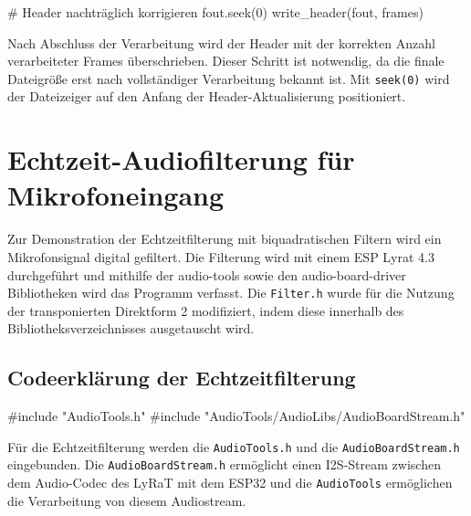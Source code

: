 \documentclass[
  ngerman,
  letterpaper,
  DIV=11]{scrreprt}
\newenvironment{Shaded}{\begin{snugshade}}{\end{snugshade}}
\newcommand{\CommentTok}[1]{\textcolor[rgb]{0.37,0.37,0.37}{#1}}
\newcommand{\DecValTok}[1]{\textcolor[rgb]{0.68,0.00,0.00}{#1}}
\newcommand{\ImportTok}[1]{\textcolor[rgb]{0.00,0.46,0.62}{#1}}
\newcommand{\NormalTok}[1]{\textcolor[rgb]{0.00,0.23,0.31}{#1}}
\newcommand{\PreprocessorTok}[1]{\textcolor[rgb]{0.68,0.00,0.00}{#1}}
\begin{document}
\begin{Shaded}
\begin{Highlighting}[]
    \CommentTok{\# Header nachträglich korrigieren}
\NormalTok{    fout.seek(}\DecValTok{0}\NormalTok{)}
\NormalTok{    write\_header(fout, frames)}
\end{Highlighting}
\end{Shaded}

Nach Abschluss der Verarbeitung wird der Header mit der korrekten Anzahl
verarbeiteter Frames überschrieben. Dieser Schritt ist notwendig, da die
finale Dateigröße erst nach vollständiger Verarbeitung bekannt ist. Mit
\texttt{seek(0)} wird der Dateizeiger auf den Anfang der
Header-Aktualisierung positioniert.

\chapter{Echtzeit-Audiofilterung für
Mikrofoneingang}\label{echtzeit-audiofilterung-fuxfcr-mikrofoneingang}

Zur Demonstration der Echtzeitfilterung mit biquadratischen Filtern wird
ein Mikrofonsignal digital gefiltert. Die Filterung wird mit einem ESP
Lyrat 4.3 durchgeführt und mithilfe der audio-tools sowie den
audio-board-driver Bibliotheken wird das Programm verfasst. Die
\texttt{Filter.h} wurde für die Nutzung der transponierten Direktform 2
modifiziert, indem diese innerhalb des Bibliotheksverzeichnisses
ausgetauscht wird.

\section{Codeerklärung der
Echtzeitfilterung}\label{codeerkluxe4rung-der-echtzeitfilterung}

\begin{Shaded}
\begin{Highlighting}[]
\PreprocessorTok{\#include }\ImportTok{"AudioTools.h"}
\PreprocessorTok{\#include }\ImportTok{"AudioTools/AudioLibs/AudioBoardStream.h"}
\end{Highlighting}
\end{Shaded}

Für die Echtzeitfilterung werden die \texttt{AudioTools.h} und die
\texttt{AudioBoardStream.h} eingebunden. Die \texttt{AudioBoardStream.h}
ermöglicht einen I2S-Stream zwischen dem Audio-Codec des LyRaT mit dem
ESP32 und die \texttt{AudioTools} ermöglichen die Verarbeitung von
diesem Audiostream.
\end{document}
